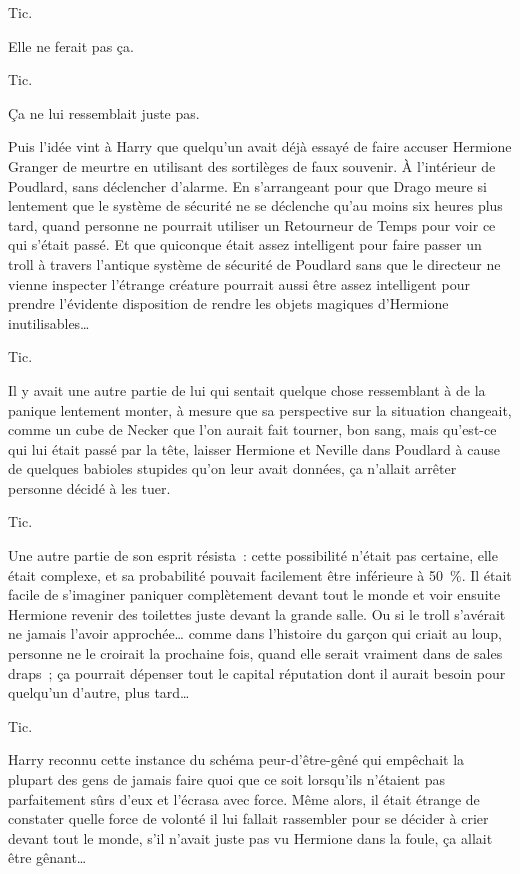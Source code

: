 Tic.

Elle ne ferait pas ça.

Tic.

Ça ne lui ressemblait juste pas.

Puis l'idée vint à Harry que quelqu'un avait déjà essayé de faire accuser Hermione Granger de meurtre en utilisant des sortilèges de faux souvenir. À l'intérieur de Poudlard, sans déclencher d'alarme. En s'arrangeant pour que Drago meure si lentement que le système de sécurité ne se déclenche qu'au moins six heures plus tard, quand personne ne pourrait utiliser un Retourneur de Temps pour voir ce qui s'était passé. Et que quiconque était assez intelligent pour faire passer un troll à travers l'antique système de sécurité de Poudlard sans que le directeur ne vienne inspecter l'étrange créature pourrait aussi être assez intelligent pour prendre l'évidente disposition de rendre les objets magiques d'Hermione inutilisables…

Tic.

Il y avait une autre partie de lui qui sentait quelque chose ressemblant à de la panique lentement monter, à mesure que sa perspective sur la situation changeait, comme un cube de Necker que l'on aurait fait tourner, bon sang, mais qu'est-ce qui lui était passé par la tête, laisser Hermione et Neville dans Poudlard à cause de quelques babioles stupides qu'on leur avait données, ça n'allait arrêter personne décidé à les tuer.

Tic.

Une autre partie de son esprit résista~: cette possibilité n'était pas certaine, elle était complexe, et sa probabilité pouvait facilement être inférieure à 50~\%. Il était facile de s'imaginer paniquer complètement devant tout le monde et voir ensuite Hermione revenir des toilettes juste devant la grande salle. Ou si le troll s'avérait ne jamais l'avoir approchée… comme dans l'histoire du garçon qui criait au loup, personne ne le croirait la prochaine fois, quand elle serait vraiment dans de sales draps~; ça pourrait dépenser tout le capital réputation dont il aurait besoin pour quelqu'un d'autre, plus tard…

Tic.

Harry reconnu cette instance du schéma peur-d'être-gêné qui empêchait la plupart des gens de jamais faire quoi que ce soit lorsqu'ils n'étaient pas parfaitement sûrs d'eux et l'écrasa avec force. Même alors, il était étrange de constater quelle force de volonté il lui fallait rassembler pour se décider à crier devant tout le monde, s'il n'avait juste pas vu Hermione dans la foule, ça allait être gênant…

